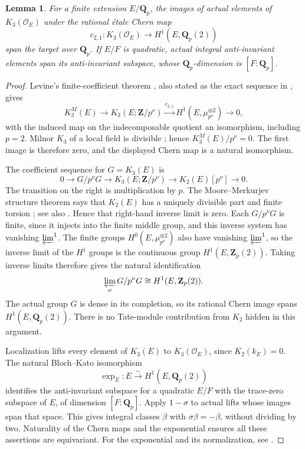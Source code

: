 \documentclass[11pt,a4paper]{article}
\newtheorem{lemma}[theorem]{Lemma}
\theoremstyle{remark}
\newcommand{\Q}{\mathbf Q}
\newcommand{\Z}{\mathbf Z}
\newcommand{\OO}{\mathcal O}
\begin{document}
\begin{lemma}\label{lem:actuallocal}
For a finite extension $E/\Q_p$, the images of actual elements of $K_3(\OO_E)$ under the rational \'etale Chern map
\[
c_{2,1}:K_3(\OO_E)\longrightarrow H^1(E,\Q_p(2))
\]
span the target over $\Q_p$. If $E/F$ is quadratic, actual integral anti-invariant elements span its anti-invariant subspace, whose $\Q_p$-dimension is $[F:\Q_p]$.
\end{lemma}
\begin{proof}
Levine's finite-coefficient theorem \cite[Theorem~4.12]{LevineIndK3}, also stated as the exact sequence in \cite[Section~5]{WeibelChern}, gives
\[
K_3^M(E)\longrightarrow K_3(E;\Z/p^\nu)
\xrightarrow{c_{2,1}}H^1(E,\mu_{p^\nu}^{\otimes2})\longrightarrow0,
\]
with the induced map on the indecomposable quotient an isomorphism, including $p=2$. Milnor $K_3$ of a local field is divisible \cite[Chapter~III, Exercise~7.4]{Weibel}; hence $K_3^M(E)/p^\nu=0$. The first image is therefore zero, and the displayed Chern map is a natural isomorphism.

The coefficient sequence for $G=K_3(E)$ is
\[
0\longrightarrow G/p^\nu G\longrightarrow K_3(E;\Z/p^\nu)
\longrightarrow K_2(E)[p^\nu]\longrightarrow0.
\]
The transition on the right is multiplication by $p$. The Moore--Merkurjev structure theorem says that $K_2(E)$ has a uniquely divisible part and finite torsion \cite{MerkurjevTorsion}; see also \cite[Chapter~III, Theorem~6.2.4]{Weibel}. Hence that right-hand inverse limit is zero. Each $G/p^\nu G$ is finite, since it injects into the finite middle group, and this inverse system has vanishing $\varprojlim^1$. The finite groups $H^0(E,\mu_{p^\nu}^{\otimes2})$ also have vanishing $\varprojlim^1$, so the inverse limit of the $H^1$ groups is the continuous group $H^1(E,\Z_p(2))$. Taking inverse limits therefore gives the natural identification
\[
\varprojlim_\nu G/p^\nu G\cong H^1(E,\Z_p(2)).
\]
The actual group $G$ is dense in its completion, so its rational Chern image spans $H^1(E,\Q_p(2))$. There is no Tate-module contribution from $K_2$ hidden in this argument.

Localization lifts every element of $K_3(E)$ to $K_3(\OO_E)$, since $K_2(k_E)=0$. The natural Bloch--Kato isomorphism
\[
\exp_E:E\xrightarrow{\sim}H^1(E,\Q_p(2))
\]
identifies the anti-invariant subspace for a quadratic $E/F$ with the trace-zero subspace of $E$, of dimension $[F:\Q_p]$. Apply $1-\sigma$ to actual lifts whose images span that space. This gives integral classes $\beta$ with $\sigma\beta=-\beta$, without dividing by two. Naturality of the Chern maps and the exponential ensures all these assertions are equivariant. For the exponential and its normalization, see \cite[Section~1.3]{HuberKings}.
\end{proof}
\end{document}
